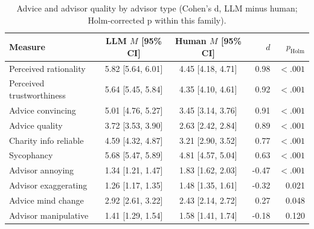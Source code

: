 \begin{table}

\caption{\label{tab:advisor_quality}Advice and advisor quality by advisor type (Cohen's d, LLM minus human; Holm-corrected p within this family).}
\centering
\begin{tabular}[t]{lccrr}
\toprule
Measure & LLM $M$ [95\% CI] & Human $M$ [95\% CI] & $d$ & $p_{\mathrm{Holm}}$\\
\midrule
Perceived rationality & 5.82 [5.64, 6.01] & 4.45 [4.18, 4.71] & 0.98 & $<.001$\\
Perceived trustworthiness & 5.64 [5.45, 5.84] & 4.35 [4.10, 4.61] & 0.92 & $<.001$\\
Advice convincing & 5.01 [4.76, 5.27] & 3.45 [3.14, 3.76] & 0.91 & $<.001$\\
Advice quality & 3.72 [3.53, 3.90] & 2.63 [2.42, 2.84] & 0.89 & $<.001$\\
Charity info reliable & 4.59 [4.32, 4.87] & 3.21 [2.90, 3.52] & 0.77 & $<.001$\\
\addlinespace
Sycophancy & 5.68 [5.47, 5.89] & 4.81 [4.57, 5.04] & 0.63 & $<.001$\\
Advisor annoying & 1.34 [1.21, 1.47] & 1.83 [1.62, 2.03] & -0.47 & $<.001$\\
Advisor exaggerating & 1.26 [1.17, 1.35] & 1.48 [1.35, 1.61] & -0.32 & 0.021\\
Advice mind change & 2.92 [2.61, 3.22] & 2.43 [2.14, 2.72] & 0.27 & 0.048\\
Advisor manipulative & 1.41 [1.29, 1.54] & 1.58 [1.41, 1.74] & -0.18 & 0.120\\
\bottomrule
\end{tabular}
\end{table}
